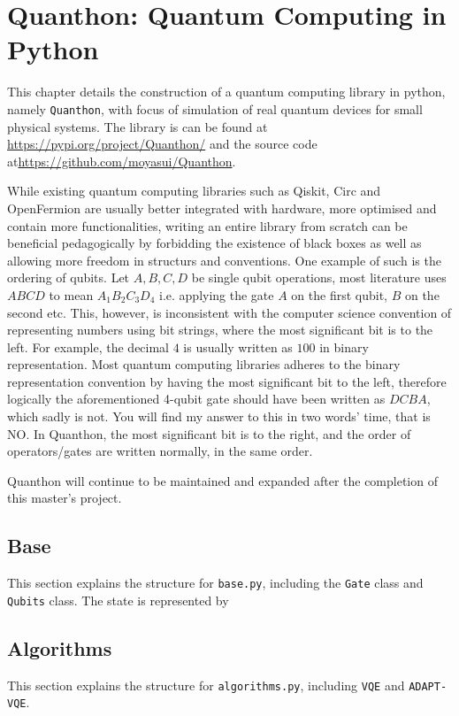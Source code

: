 \chapter{Quanthon: Quantum Computing in Python}
\label{ch:quanthon}

This chapter details the construction of a quantum computing library in python, namely \texttt{Quanthon}, with focus of simulation of real quantum devices for small physical systems. The library is can be found at \url{https://pypi.org/project/Quanthon/} and the source code at\url{https://github.com/moyasui/Quanthon}.

While existing quantum computing libraries such as Qiskit, Circ and OpenFermion \missingref are usually better integrated with hardware, more optimised and contain more functionalities, writing an entire library from scratch can be beneficial pedagogically by forbidding the existence of black boxes as well as allowing more freedom in structurs and conventions. One example of such is the ordering of qubits. Let $ A,B,C,D $ be single qubit operations, most literature uses $ ABCD $ to mean $ A_1B_2C_3D_4 $ i.e. applying the gate $ A $ on the first qubit, $ B $ on the second etc. This, however, is inconsistent with the computer science convention of representing numbers using bit strings, where the most significant bit is to the left. For example, the decimal $ 4 $ is usually written as $ 100 $ in binary representation. Most quantum computing libraries adheres to the binary representation convention by having the most significant bit to the left, therefore logically the aforementioned 4-qubit gate should have been written as $ DCBA $, which sadly is not. You will find my answer to this in two words' time, that is NO. In Quanthon, the most significant bit is to the right, and the order of operators/gates are written normally, in the same order. 

Quanthon will continue to be maintained and expanded after the completion of this master's project. 

\newpage

\section{Base}
\label{sec:base}
This section explains the structure for \texttt{base.py}, including the \texttt{Gate} class and \texttt{Qubits} class.
The state is represented by 
\begin{listing}[language=python]
	
\end{listing}

\section{Algorithms}
\label{sec:algo}
This section explains the structure for \texttt{algorithms.py}, including \texttt{VQE} and \texttt{ADAPT-VQE}.

